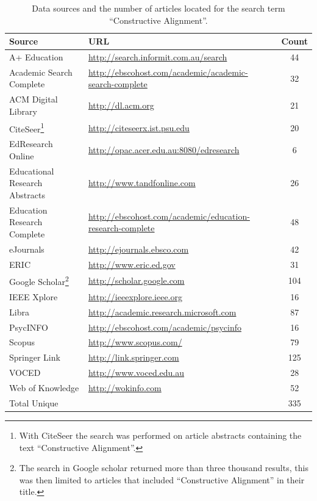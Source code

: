\begin{savenotes}
\begin{table}[ht]
	\centering
	\caption{Data sources and the number of articles located for the search term ``Constructive Alignment''.}
	\label{tbl:review_source}
	\footnotesize
    \begin{tabular}{l|l|c}
    \textbf{Source} & \textbf{URL} & \textbf{Count} \\ \hline
    A+ Education & \url{http://search.informit.com.au/search} & 44 \\
    Academic Search Complete & \scriptsize \url{http://ebscohost.com/academic/academic-search-complete} & 32 \\
    ACM Digital Library & \url{http://dl.acm.org} & 21 \\
    CiteSeer\footnote{With CiteSeer the search was performed on article abstracts containing the text ``Constructive Alignment''.}  & \url{http://citeseerx.ist.psu.edu} & 20 \\
    EdResearch Online & \url{http://opac.acer.edu.au:8080/edresearch} & 6 \\
    Educational Research Abstracts & \url{http://www.tandfonline.com} & 26 \\
    Education Research Complete & \scriptsize \url{http://ebscohost.com/academic/education-research-complete} & 48 \\
    eJournals & \url{http://ejournals.ebsco.com} & 42 \\
    ERIC & \url{http://www.eric.ed.gov} & 31 \\
    Google Scholar\footnote{The search in Google scholar returned more than three thousand results, this was then limited to articles that included ``Constructive Alignment'' in their title.} & \url{http://scholar.google.com} & 104 \\
    IEEE Xplore & \url{http://ieeexplore.ieee.org} & 16 \\
    Libra & \url{http://academic.research.microsoft.com} & 87\\
	PsycINFO & \url{http://ebscohost.com/academic/psycinfo} & 16 \\
	Scopus & \url{http://www.scopus.com/} & 79 \\
	Springer Link & \url{http://link.springer.com} & 125 \\
	VOCED & \url{http://www.voced.edu.au} & 28 \\
	Web of Knowledge & \url{http://wokinfo.com} & 52 \\ \hline
	Total Unique & & 335 \\
    \end{tabular}
\end{table}
\end{savenotes}










